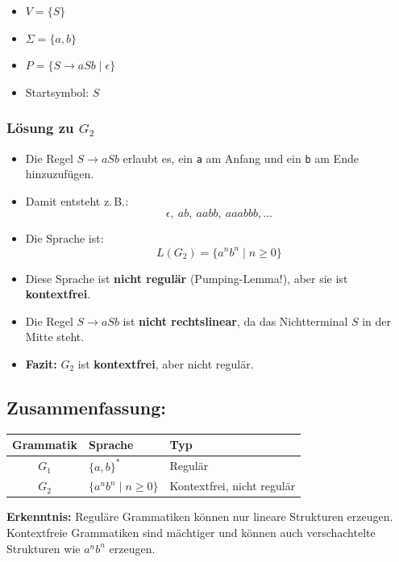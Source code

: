 \documentclass[a4paper,12pt]{article}
\begin{document}
\begin{enumerate}
			\begin{itemize}
				\item \( V = \{S\} \)
				\item \( \Sigma = \{a, b\} \)
				\item \( P = \{S \rightarrow aSb \mid \epsilon\} \)
				\item Startsymbol: \( S \)
			\end{itemize}
			
			\subsubsection*{Lösung zu \( G_2 \)}
			
			\begin{itemize}
				\item Die Regel \( S \rightarrow aSb \) erlaubt es, ein \texttt{a} am Anfang und ein \texttt{b} am Ende hinzuzufügen.
				\item Damit entsteht z.\,B.:
				\[
				\epsilon,\ ab,\ aabb,\ aaabbb,\dotsc
				\]
				\item Die Sprache ist:
				\[
				L(G_2) = \{ a^n b^n \mid n \geq 0 \}
				\]
				\item Diese Sprache ist \textbf{nicht regulär} (Pumping-Lemma!), aber sie ist \textbf{kontextfrei}.
				\item Die Regel \( S \rightarrow aSb \) ist \textbf{nicht rechtslinear}, da das Nichtterminal \( S \) in der Mitte steht.
				\item \textbf{Fazit:} \( G_2 \) ist \textbf{kontextfrei}, aber nicht regulär.
			\end{itemize}
			
			\vspace{1em}
			
			\subsection*{Zusammenfassung:}
			
			\begin{tabular}{|c|l|l|}
				\hline
				\textbf{Grammatik} & \textbf{Sprache} & \textbf{Typ} \\
				\hline
				\( G_1 \) & \( \{a, b\}^* \) & Regulär \\
				\hline
				\( G_2 \) & \( \{a^n b^n \mid n \geq 0\} \) & Kontextfrei, nicht regulär \\
				\hline
			\end{tabular}
			
			\vspace{1em}
			
			\textbf{Erkenntnis:}  
			Reguläre Grammatiken können nur lineare Strukturen erzeugen.  
			Kontextfreie Grammatiken sind mächtiger und können auch verschachtelte Strukturen wie \( a^n b^n \) erzeugen.
			
			
			
		\end{enumerate}	
		

	
\end{document}

